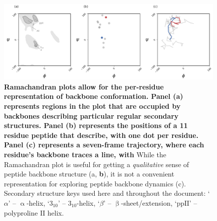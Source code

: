 \documentclass[fleqn,10pt,lineno]{wlpeerj} %
\newcommand{\n}[1]{{\textbf{\color{red}#1}}}
\begin{document}
\begin{figure}[t!]
\begin{adjustwidth}{-1in}{0in} %
\centering
\includegraphics[width=1.0\linewidth]{automated_figures/fig_rama_intro.pdf}
\caption{\n{Ramachandran plots allow for the per-residue representation of backbone conformation. Panel (a) represents regions in the plot that are occupied by backbones describing particular regular secondary structures. Panel (b) represents the positions of a 11 residue peptide that describe, with one dot per residue. Panel (c) represents a seven-frame trajectory, where each residue's backbone traces a line, with } While the Ramachandran plot is useful for getting a {\it qualitative} sense of peptide backbone structure (a, \n{b}), it is not a convenient representation for exploring peptide backbone dynamics (c). {\footnotesize Secondary structure keys used here and throughout the document: `$\alpha$' -- $\upalpha$-helix, `$3_{10}$' -- $3_{10}$-helix, `$\beta$' -- $\upbeta$-sheet/extension, `$\textrm{ppII}$' -- polyproline II helix.}\label{fig:ramaintro}} 
\end{adjustwidth}
\end{figure}
\end{document}
